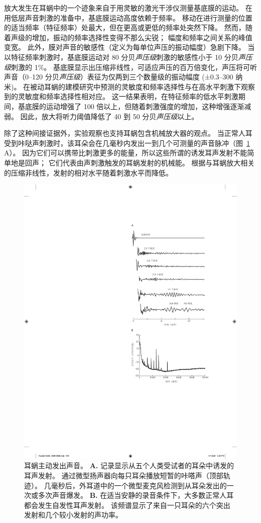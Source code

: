 放大发生在耳蜗中的一个迹象来自于用灵敏的激光干涉仪测量基底膜的运动。
在用低层声音刺激的准备中，基底膜运动高度依赖于频率。
移动在进行测量的位置的适当频率（特征频率）处最大，但在更高或更低的频率处突然下降。
然而，随着声级的增加，振动的频率选择性变得不那么尖锐；
幅度和频率之间关系的峰值变宽。
此外，膜对声音的敏感性（定义为每单位声压的振动幅度）急剧下降。
当以特征频率刺激时，基底膜运动对 80 分贝\textit{声压级}刺激的敏感性小于 10 分贝\textit{声压级}刺激的 1\%。
基底膜显示出压缩非线性，可适应声压的百万倍变化，声压将可听声音（0–120 分贝\textit{声压级}）表征为仅两到三个数量级的振动幅度 (±0.3–300 纳米)。
在被动耳蜗的建模研究中预测的灵敏度和频率选择性与在高水平刺激下观察到的灵敏度和频率选择性相对应。
这一结果表明，在特征频率的低水平刺激期间，基底膜的运动增强了 100 倍以上，但随着刺激强度的增加，这种增强逐渐减弱。
因此，放大将听力阈值降低了 40 到 50 分贝\textit{声压级}以上。


除了这种间接证据外，实验观察也支持耳蜗包含机械放大器的观点。
当正常人耳受到咔哒声刺激时，该耳朵会在几毫秒内发出一到几个可测量的声音脉冲（图~\ref{fig:26_13} A）。
因为它们可以携带比刺激更多的能量，所以这些所谓的诱发耳声发射不能简单地是回声；
它们代表由声刺激触发的耳蜗发射的机械能。
根据与耳蜗放大相关的压缩非线性，发射的相对水平随着刺激水平而降低。


\begin{figure}[htbp]
	\centering
	\includegraphics[width=0.65\linewidth]{chap26/fig_26_13}
	\caption{耳蜗主动发出声音。
		\textbf{A.} 记录显示从五个人类受试者的耳朵中诱发的耳声发射。
		通过微型扬声器向每只耳朵播放短暂的咔嗒声（顶部轨迹）。
		几毫秒后，外耳道中的一个微型麦克风检测到从耳朵发出的一次或多次声音爆发\cite{wilson1980evidence}。
		\textbf{B.} 在适当安静的录音条件下，大多数正常人耳都会发生自发性耳声发射。
		该频谱显示了来自一只耳朵的六个突出发射和几个较小发射的声功率\cite{murphy1995relaxation}。}
	\label{fig:26_13}
\end{figure}


